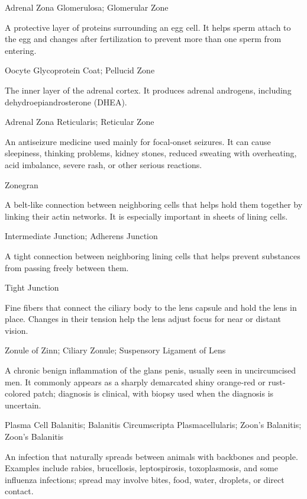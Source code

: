 \synonyms
Adrenal Zona Glomerulosa; Glomerular Zone

 A protective layer of proteins surrounding an egg cell. It helps sperm attach to the egg and changes after fertilization to prevent more than one sperm from entering.

\synonyms
Oocyte Glycoprotein Coat; Pellucid Zone

 The inner layer of the adrenal cortex. It produces adrenal androgens, including dehydroepiandrosterone (DHEA).

\synonyms
Adrenal Zona Reticularis; Reticular Zone

 An antiseizure medicine used mainly for focal-onset seizures. It can cause sleepiness, thinking problems, kidney stones, reduced sweating with overheating, acid imbalance, severe rash, or other serious reactions.

\synonyms
Zonegran

 A belt-like connection between neighboring cells that helps hold them together by linking their actin networks. It is especially important in sheets of lining cells.

\synonyms
Intermediate Junction; Adherens Junction

 A tight connection between neighboring lining cells that helps prevent substances from passing freely between them.

\synonyms
Tight Junction

 Fine fibers that connect the ciliary body to the lens capsule and hold the lens in place. Changes in their tension help the lens adjust focus for near or distant vision.

\synonyms
Zonule of Zinn; Ciliary Zonule; Suspensory Ligament of Lens

 A chronic benign inflammation of the glans penis, usually seen in uncircumcised men. It commonly appears as a sharply demarcated shiny orange-red or rust-colored patch; diagnosis is clinical, with biopsy used when the diagnosis is uncertain.

\synonyms
Plasma Cell Balanitis; Balanitis Circumscripta Plasmacellularis; Zoon's Balanitis; Zoon’s Balanitis

 An infection that naturally spreads between animals with backbones and people. Examples include rabies, brucellosis, leptospirosis, toxoplasmosis, and some influenza infections; spread may involve bites, food, water, droplets, or direct contact.

